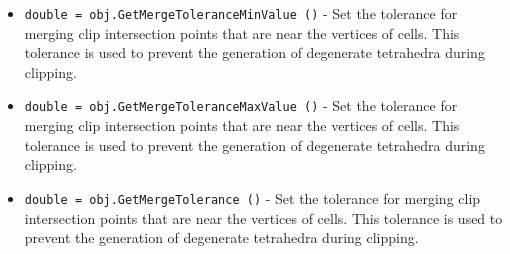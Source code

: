 \begin{itemize}
\item  \verb|double = obj.GetMergeToleranceMinValue ()| -  Set the tolerance for merging clip intersection points that are near
 the vertices of cells. This tolerance is used to prevent the generation
 of degenerate tetrahedra during clipping.

\item  \verb|double = obj.GetMergeToleranceMaxValue ()| -  Set the tolerance for merging clip intersection points that are near
 the vertices of cells. This tolerance is used to prevent the generation
 of degenerate tetrahedra during clipping.

\item  \verb|double = obj.GetMergeTolerance ()| -  Set the tolerance for merging clip intersection points that are near
 the vertices of cells. This tolerance is used to prevent the generation
 of degenerate tetrahedra during clipping.

\end{itemize}
